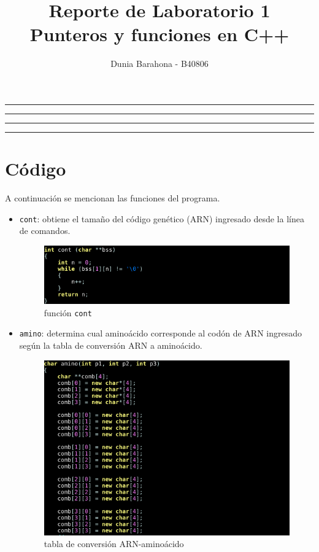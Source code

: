 \documentclass[11pt]{article}
\title{Reporte de Laboratorio 1\\Punteros y funciones en C++}
\author{Dunia Barahona - B40806}
\begin{document}
\maketitle
\hrule
\hrule
\tableofcontents
\hspace{5mm}
\hrule
\hrule

\section{Código}
A continuación se mencionan las funciones del programa.
\begin{itemize}
	\item \texttt{cont}: obtiene el tamaño del código genético (ARN) ingresado desde la línea de comandos.
	
	\begin{figure}[H]
		\centering
		\includegraphics[scale=0.9]{cont.png}
		\caption{función \texttt{cont}}
		\label{fig:fcont}
	\end{figure}
	\newpage
	\item \texttt{amino}: determina cual aminoácido corresponde al codón de ARN ingresado según la tabla de conversión ARN a aminoácido.
	
	\begin{figure}[H]
		\centering
		\includegraphics[scale=0.9]{amino_1.png}
		\caption{tabla de conversión ARN-aminoácido}
		\label{fig:fam1}
	\end{figure}
	

\end{itemize}
\end{document}
